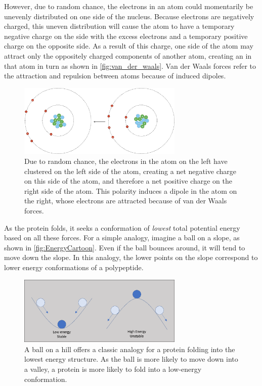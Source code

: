 However, due to random chance, the electrons in an atom could momentarily be unevenly distributed on one side of the nucleus. Because electrons are negatively charged, this uneven distribution will cause the atom to have a temporary negative charge on the side with the excess electrons and a temporary positive charge on the opposite side. As a result of this charge, one side of the atom may attract only the oppositely charged components of another atom, creating an  in that atom in turn as shown in \autoref{fig:van_der_waals}. Van der Waals forces refer to the attraction and repulsion between atoms because of induced dipoles.

\begin{figure}[h]
	\centering
	\mySfFamily
	\includegraphics[width = 0.7\textwidth]{../images/van_der_waals.png}
	\caption{Due to random chance, the electrons in the atom on the left have clustered on the left side of the atom, creating a net negative charge on this side of the atom, and therefore a net positive charge on the right side of the atom. This polarity induces a dipole in the atom on the right, whose electrons are attracted because of van der Waals forces.}
	\label{fig:van_der_waals}
\end{figure}

As the protein folds, it seeks a conformation of \textit{lowest} total potential energy based on all these forces. For a simple analogy, imagine a ball on a slope, as shown in \autoref{fig:EnergyCartoon}. Even if the ball bounces around, it will tend to move down the slope. In this analogy, the lower points on the slope correspond to lower energy conformations of a polypeptide.

\begin{figure}[h]
	\centering
	\mySfFamily
	\includegraphics[width = 0.7\textwidth]{../images/EnergyCartoon.png}
	\caption{A ball on a hill offers a classic analogy for a protein folding into the lowest energy structure. As the ball is more likely to move down into a valley, a protein is more likely to fold into a low-energy conformation.}
	\label{fig:EnergyCartoon}
\end{figure}

